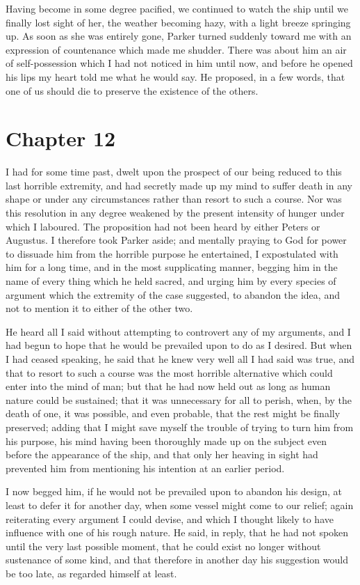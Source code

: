 Having become in some degree pacified, we continued to watch the ship until
we finally lost sight of her, the weather becoming hazy, with a light breeze
springing up. As soon as she was entirely gone, Parker turned suddenly toward me
with an expression of countenance which made me shudder. There was about him an
air of self-possession which I had not noticed in him until now, and before he
opened his lips my heart told me what he would say. He proposed, in a few words,
that one of us should die to preserve the existence of the others. 

\section{Chapter 12}
I had for some time past, dwelt upon the prospect of our being reduced to
this last horrible extremity, and had secretly made up my mind to suffer death
in any shape or under any circumstances rather than resort to such a course. Nor
was this resolution in any degree weakened by the present intensity of hunger
under which I laboured. The proposition had not been heard by either Peters or
Augustus. I therefore took Parker aside; and mentally praying to God for power
to dissuade him from the horrible purpose he entertained, I expostulated with
him for a long time, and in the most supplicating manner, begging him in the
name of every thing which he held sacred, and urging him by every species of
argument which the extremity of the case suggested, to abandon the idea, and not
to mention it to either of the other two. 

He heard all I said without attempting to controvert any of my arguments, and
I had begun to hope that he would be prevailed upon to do as I desired. But when
I had ceased speaking, he said that he knew very well all I had said was true,
and that to resort to such a course was the most horrible alternative which
could enter into the mind of man; but that he had now held out as long as human
nature could be sustained; that it was unnecessary for all to perish, when, by
the death of one, it was possible, and even probable, that the rest might be
finally preserved; adding that I might save myself the trouble of trying to turn
him from his purpose, his mind having been thoroughly made up on the subject
even before the appearance of the ship, and that only her heaving in sight had
prevented him from mentioning his intention at an earlier period. 

I now begged him, if he would not be prevailed upon to abandon his design, at
least to defer it for another day, when some vessel might come to our relief;
again reiterating every argument I could devise, and which I thought likely to
have influence with one of his rough nature. He said, in reply, that he had not
spoken until the very last possible moment, that he could exist no longer
without sustenance of some kind, and that therefore in another day his
suggestion would be too late, as regarded himself at least. 

